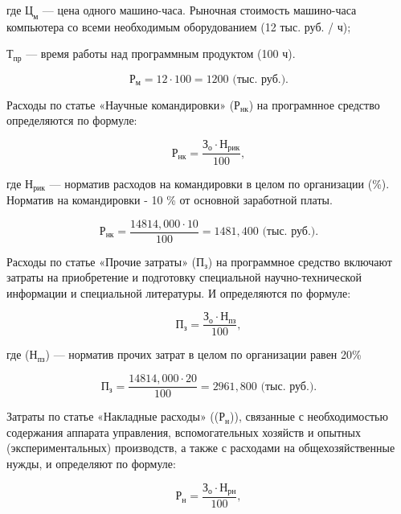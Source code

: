 где \(\text{Ц}_{\text{м}}\) --- цена одного машино-часа. Рыночная стоимость машино-часа компьютера со всеми необходимым оборудованием (12 тыс. руб. / ч);

\(\text{Т}_{\text{пр}}\) --- время работы над программным продуктом (100 ч).

\begin{displaymath}
  \text{Р}_{\text{м}} = 12 \cdot 100 = 1200 \text{ (тыс. руб.)}.
\end{displaymath}

Расходы по статье «Научные командировки» (\(\text{Р}_{\text{нк}}\)) на програмнное средство определяются по формуле:

\begin{displaymath}
  \text{Р}_{\text{нк}} = \frac{\text{З}_{\text{о}} \cdot \text{Н}_{\text{рик}}}{100},
\end{displaymath}

где \(\text{Н}_{\text{рик}}\) --- норматив расходов на командировки в целом по организации (\%). Норматив на командировки - 10 \% от основной заработной платы.

\begin{displaymath}
  \text{Р}_{\text{нк}} = \frac{14814,000 \cdot 10}{100} = 1481,400 \text{ (тыс. руб.)}.
\end{displaymath}

Расходы по статье «Прочие затраты» (\(\text{П}_{\text{з}}\)) на программное средство включают затраты на приобретение и подготовку специальной научно-технической информации и специальной литературы. И определяются по формуле:

\begin{displaymath}
  \text{П}_{\text{з}} = \frac{\text{З}_{\text{о}} \cdot \text{Н}_{\text{пз}}}{100},
\end{displaymath}

где (\(\text{Н}_{\text{пз}}\)) --- норматив прочих затрат в целом по организации равен 20\%

\begin{displaymath}
  \text{П}_{\text{з}} = \frac{14814,000 \cdot 20}{100} = 2961,800 \text{ (тыс. руб.)}.
\end{displaymath}

Затраты по статье «Накладные расходы» ((\(\text{Р}_{\text{н}}\))), связанные с необходимостью содержания аппарата управления, вспомогательных хозяйств и опытных (экспериментальных) производств, а также с расходами на общехозяйственные нужды, и определяют по формуле:

\begin{displaymath}
  \text{Р}_{\text{н}} = \frac{\text{З}_{\text{о}} \cdot \text{Н}_{\text{рн}}}{100},
\end{displaymath}

